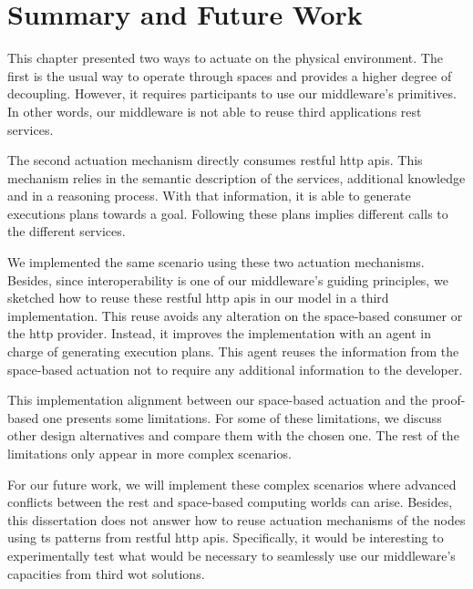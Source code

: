 \section{Summary and Future Work}
\label{sec:actuation_summary}

This chapter presented two ways to actuate on the physical environment.
The first is the usual way to operate through spaces and provides a higher degree of decoupling.
However, it requires participants to use our middleware's primitives. %
In other words, our middleware is not able to reuse third applications \ac{rest} services.


The second actuation mechanism directly consumes \ac{rest}ful \acs{http} \acsp{api}.
This mechanism relies in the semantic description of the services, additional knowledge and in a reasoning process. %
With that information, it is able to generate executions plans towards a goal.
Following these plans implies different calls to the different services.


We implemented the same scenario using these two actuation mechanisms.
Besides, since interoperability is one of our middleware's guiding principles, we sketched how to reuse these \ac{rest}ful \acs{http} \acsp{api} in our \Space{} model in a third implementation.
This reuse avoids any alteration on the space-based consumer or the \ac{http} provider.
Instead, it improves the \Space{} implementation with an agent in charge of generating execution plans.
This agent reuses the information from the space-based actuation not to require any additional information to the developer.


This implementation alignment between our space-based actuation and the proof-based one presents some limitations.
For some of these limitations, we discuss other design alternatives and compare them with the chosen one.
The rest of the limitations only appear in more complex scenarios.


For our future work, we will implement these complex scenarios where advanced conflicts between the \ac{rest} and space-based computing worlds can arise.
Besides, this dissertation does not answer how to reuse actuation mechanisms of the nodes using \ac{ts} patterns from \ac{rest}ful \acs{http} \acsp{api}.
Specifically, it would be interesting to experimentally test what would be necessary to seamlessly use our middleware's capacities from  third \ac{wot} solutions.